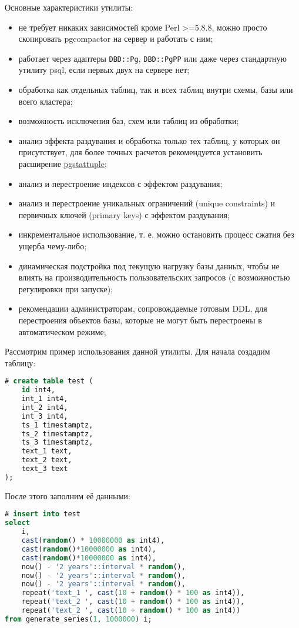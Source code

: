Основные характеристики утилиты:

\begin{itemize}
  \item не требует никаких зависимостей кроме Perl >=5.8.8, можно просто скопировать pgcompactor на сервер и работать с ним;
  \item работает через адаптеры \lstinline!DBD::Pg!, \lstinline!DBD::PgPP! или даже через стандартную утилиту psql, если первых двух на сервере нет;
  \item обработка как отдельных таблиц, так и всех таблиц внутри схемы, базы или всего кластера;
  \item возможность исключения баз, схем или таблиц из обработки;
  \item анализ эффекта раздувания и обработка только тех таблиц, у которых он присутствует, для более точных расчетов рекомендуется установить расширение \href{https://www.postgresql.org/docs/current/static/pgstattuple.html}{pgstattuple};
  \item анализ и перестроение индексов с эффектом раздувания;
  \item анализ и перестроение уникальных ограничений (unique constraints) и первичных ключей (primary keys) с эффектом раздувания;
  \item инкрементальное использование, т. е. можно остановить процесс сжатия без ущерба чему-либо;
  \item динамическая подстройка под текущую нагрузку базы данных, чтобы не влиять на производительность пользовательских запросов (с возможностью регулировки при запуске);
  \item рекомендации администраторам, сопровождаемые готовым DDL, для перестроения объектов базы, которые не могут быть перестроены в автоматическом режиме;
\end{itemize}

Рассмотрим пример использования данной утилиты. Для начала создадим таблицу:

\begin{lstlisting}[language=SQL,label=lst:pgcompactor1,caption=Создаем test таблицу]
# create table test (
    id int4,
    int_1 int4,
    int_2 int4,
    int_3 int4,
    ts_1 timestamptz,
    ts_2 timestamptz,
    ts_3 timestamptz,
    text_1 text,
    text_2 text,
    text_3 text
);
\end{lstlisting}

После этого заполним её данными:

\begin{lstlisting}[language=SQL,label=lst:pgcompactor2,caption=Заполняем данными test таблицу]
# insert into test
select
    i,
    cast(random() * 10000000 as int4),
    cast(random()*10000000 as int4),
    cast(random()*10000000 as int4),
    now() - '2 years'::interval * random(),
    now() - '2 years'::interval * random(),
    now() - '2 years'::interval * random(),
    repeat('text_1 ', cast(10 + random() * 100 as int4)),
    repeat('text_2 ', cast(10 + random() * 100 as int4)),
    repeat('text_2 ', cast(10 + random() * 100 as int4))
from generate_series(1, 1000000) i;
\end{lstlisting}

